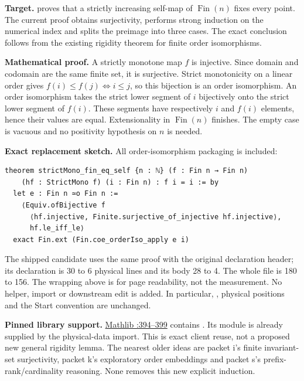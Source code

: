 \textbf{Target.}  proves that a strictly increasing self-map of \(\operatorname{Fin}(n)\) fixes every point. The current proof obtains surjectivity, performs strong induction on the numerical index and splits the preimage into three cases. The exact conclusion follows from the existing rigidity theorem for finite order isomorphisms.

\textbf{Mathematical proof.} A strictly monotone map \(f\) is injective. Since domain and codomain are the same finite set, it is surjective. Strict monotonicity on a linear order gives \(f(i)\le f(j)\iff i\le j\), so this bijection is an order isomorphism. An order isomorphism takes the strict lower segment of \(i\) bijectively onto the strict lower segment of \(f(i)\). These segments have respectively \(i\) and \(f(i)\) elements, hence their values are equal. Extensionality in \(\operatorname{Fin}(n)\) finishes. The empty case is vacuous and no positivity hypothesis on \(n\) is needed.

\textbf{Exact replacement sketch.} All order-isomorphism packaging is included:
\begin{lstlisting}
theorem strictMono_fin_eq_self {n : ℕ} (f : Fin n → Fin n)
    (hf : StrictMono f) (i : Fin n) : f i = i := by
  let e : Fin n ≃o Fin n :=
    ⟨Equiv.ofBijective f
      ⟨hf.injective, Finite.surjective_of_injective hf.injective⟩,
      hf.le_iff_le⟩
  exact Fin.ext (Fin.coe_orderIso_apply e i)
\end{lstlisting}
The shipped candidate uses the same proof with the original declaration header; its declaration is 30 to 6 physical lines and its body 28 to 4. The whole file is 180 to 156. The wrapping above is for page readability, not the measurement. No helper, import or downstream edit is added. In particular, , physical positions and the Start convention are unchanged.

\textbf{Pinned library support.} \href{https://github.com/leanprover-community/mathlib4/blob/81a5d257c8e410db227a6665ed08f64fea08e997/Mathlib/Order/Fin/Basic.lean\#L394-L399}{Mathlib :394--399} contains . Its module is already supplied by the physical-data import. This is exact client reuse, not a proposed new general rigidity lemma. The nearest older ideas are packet i's finite invariant-set surjectivity, packet k's exploratory order embeddings and packet s's prefix-rank/cardinality reasoning. None removes this new explicit induction.

